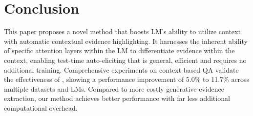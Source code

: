 \section{Conclusion}\label{sec:con}
\vspace{-5pt}
This paper proposes a novel method \se that boosts LM's ability to utilize context with automatic contextual evidence highlighting.
It harnesses the inherent ability of specific attention layers within the LM to differentiate evidence within the context, enabling test-time auto-eliciting that is general, efficient and requires no additional training.
Comprehensive experiments on context based QA validate the effectiveness of \se, showing a performance improvement of 5.0\% to 11.7\% across multiple datasets and LMs. 
Compared to more costly generative evidence extraction, our method achieves better performance with far less additional computational overhead.